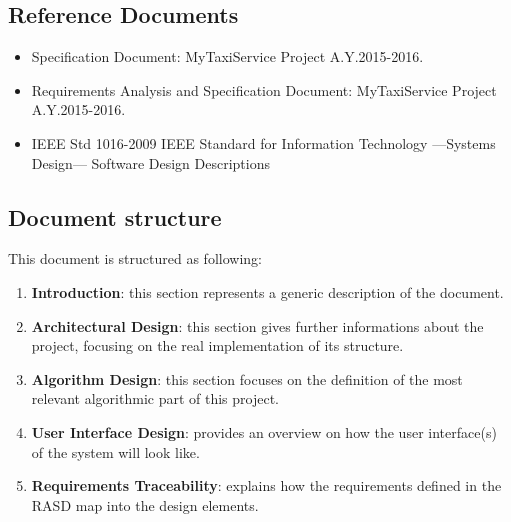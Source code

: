 \subsection{Reference Documents}
\begin{itemize}
	\item Specification Document: MyTaxiService Project A.Y.2015-2016.
	\item Requirements Analysis and Specification Document: MyTaxiService Project A.Y.2015-2016.
	\item IEEE Std 1016-2009 IEEE Standard for Information Technology —Systems Design— Software Design Descriptions
\end{itemize}
\subsection{Document structure}
This document is structured as following:
\begin{enumerate}
	\item \textbf{Introduction}: this section represents a generic description of the document.
	\item \textbf{Architectural Design}: this section gives further informations about the project, focusing on the real implementation of its structure.
	\item \textbf{Algorithm Design}: this section focuses on the definition of the most relevant
	algorithmic part of this project.
	\item \textbf{User Interface Design}: provides an overview on how the user interface(s) of the system will look like.
	\item \textbf{Requirements Traceability}: explains how the requirements defined in the RASD map	into the design elements.
\end{enumerate}